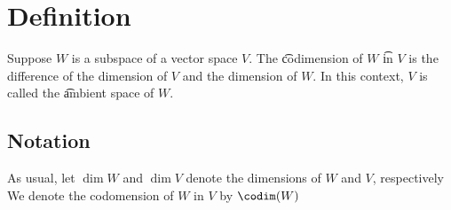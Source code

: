 

\section*{Definition}

Suppose $W$ is a subspace of a vector space $V$.
The \t{codimension} of $W$ \t{in} $V$ is the difference of the dimension of $V$ and the dimension of $W$.
In this context, $V$ is called the \t{ambient space} of $W$.

\subsection*{Notation}

As usual, let $\dim W$ and $\dim V$ denote the dimensions of $W$ and $V$, respectively
We denote the codomension of $W$ in $V$ by $\codim(W)$

\blankpage